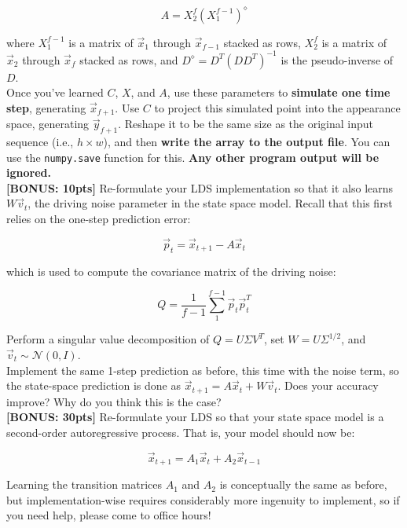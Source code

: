 \documentclass[paper=a4, fontsize=11pt]{scrartcl} %
\numberwithin{figure}{section} %
\numberwithin{table}{section} %
\begin{document}
$$
A = X_2^f (X_1^{f - 1})^{\diamond}
$$

where $X_1^{f - 1}$ is a matrix of $\vec{x}_1$ through $\vec{x}_{f - 1}$ stacked as rows, $X_2^f$ is a matrix of $\vec{x}_2$ through $\vec{x}_f$ stacked as rows, and $D^{\diamond} = D^T(DD^T)^{-1}$ is the pseudo-inverse of $D$. \\

Once you've learned $C$, $X$, and $A$, use these parameters to \textbf{simulate one time step}, generating $\vec{x}_{f + 1}$. Use $C$ to project this simulated point into the appearance space, generating $\vec{y}_{f + 1}$. Reshape it to be the same size as the original input sequence (i.e., $h \times w$), and then \textbf{write the array to the output file}. You can use the \texttt{numpy.save} function for this. \textbf{Any other program output will be ignored.} \\

\textbf{[BONUS: 10pts]} Re-formulate your LDS implementation so that it also learns $W\vec{v}_t$, the driving noise parameter in the state space model. Recall that this first relies on the one-step prediction error:

$$
\vec{p}_t = \vec{x}_{t + 1} - A\vec{x}_t
$$

which is used to compute the covariance matrix of the driving noise:

$$
Q = \frac{1}{f - 1} \sum_1^{f - 1} \vec{p}_t \vec{p}_t^T
$$

Perform a singular value decomposition of $Q = U \Sigma V^T$, set $W = U \Sigma^{1/2}$, and $\vec{v}_t \sim \mathcal{N}(0, I)$. \\

Implement the same 1-step prediction as before, this time with the noise term, so the state-space prediction is done as $\vec{x}_{t + 1} = A\vec{x}_t + W\vec{v}_t$. Does your accuracy improve? Why do you think this is the case? \\

\textbf{[BONUS: 30pts]} Re-formulate your LDS so that your state space model is a second-order autoregressive process. That is, your model should now be:

$$
\vec{x}_{t + 1} = A_1\vec{x}_t + A_2\vec{x}_{t - 1}
$$

Learning the transition matrices $A_1$ and $A_2$ is conceptually the same as before, but implementation-wise requires considerably more ingenuity to implement, so if you need help, please come to office hours! \\
\end{document}
